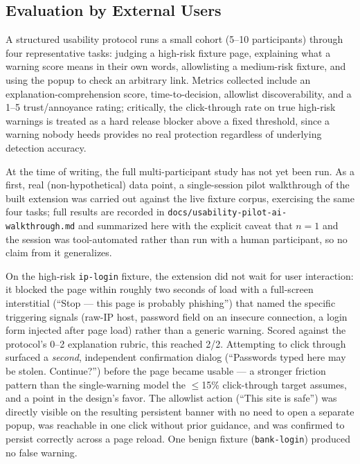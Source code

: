 \documentclass[conference]{IEEEtran}
\begin{document}
\subsection{Evaluation by External Users}
A structured usability protocol runs a small cohort (5--10 participants) through four representative tasks: judging a high-risk fixture page, explaining what a warning score means in their own words, allowlisting a medium-risk fixture, and using the popup to check an arbitrary link. Metrics collected include an explanation-comprehension score, time-to-decision, allowlist discoverability, and a 1--5 trust/annoyance rating; critically, the click-through rate on true high-risk warnings is treated as a hard release blocker above a fixed threshold, since a warning nobody heeds provides no real protection regardless of underlying detection accuracy.

At the time of writing, the full multi-participant study has not yet been run. As a first, real (non-hypothetical) data point, a single-session pilot walkthrough of the built extension was carried out against the live fixture corpus, exercising the same four tasks; full results are recorded in \texttt{docs/usability-pilot-ai-walkthrough.md} and summarized here with the explicit caveat that $n=1$ and the session was tool-automated rather than run with a human participant, so no claim from it generalizes.

On the high-risk \texttt{ip-login} fixture, the extension did not wait for user interaction: it blocked the page within roughly two seconds of load with a full-screen interstitial (``Stop --- this page is probably phishing'') that named the specific triggering signals (raw-IP host, password field on an insecure connection, a login form injected after page load) rather than a generic warning. Scored against the protocol's 0--2 explanation rubric, this reached 2/2. Attempting to click through surfaced a \emph{second}, independent confirmation dialog (``Passwords typed here may be stolen. Continue?'') before the page became usable --- a stronger friction pattern than the single-warning model the $\leq$15\% click-through target assumes, and a point in the design's favor. The allowlist action (``This site is safe'') was directly visible on the resulting persistent banner with no need to open a separate popup, was reachable in one click without prior guidance, and was confirmed to persist correctly across a page reload. One benign fixture (\texttt{bank-login}) produced no false warning.
\end{document}
